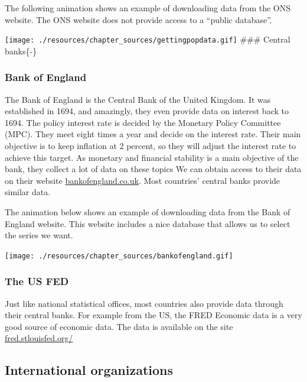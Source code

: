 \documentclass[
]{book}
\begin{document}
The following animation shows an example of downloading data from the ONS website. The ONS website does not provide access to a ``public database''.

\texttt{[image: ./resources/chapter\_sources/gettingpopdata.gif]}
\#\#\# Central banks\{-\}

\hypertarget{bank-of-england}{%
\subsubsection*{Bank of England}\label{bank-of-england}}

The Bank of England is the Central Bank of the United Kingdom. It was established in 1694, and amazingly, they even provide data on interest back to 1694. The policy interest rate is decided by the Monetary Policy Committee (MPC). They meet eight times a year and decide on the interest rate. Their main objective is to keep inflation at 2 percent, so they will adjust the interest rate to achieve this target. As monetary and financial stability is a main objective of the bank, they collect a lot of data on these topics We can obtain access to their data on their website \href{https://www.bankofengland.co.uk}{bankofengland.co.uk}. Most countries' central banks provide similar data.

The animation below shows an example of downloading data from the Bank of England website. This website includes a nice database that allows us to select the series we want.

\texttt{[image: ./resources/chapter\_sources/bankofengland.gif]}

\hypertarget{the-us-fed}{%
\subsubsection*{The US FED}\label{the-us-fed}}

Just like national statistical offices, most countries also provide data through their central banks. For example from the US, the FRED Economic data is a very good source of economic data. The data is available on the site \href{https://fred.stlouisfed.org/}{fred.stlouisfed.org/}

\hypertarget{international-organizations}{%
\subsection*{International organizations}\label{international-organizations}}
\end{document}

